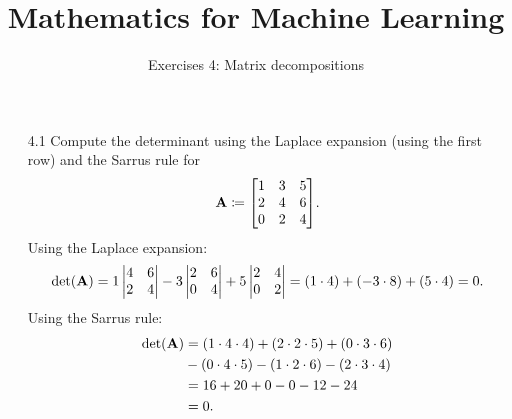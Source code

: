 \documentclass[11pt]{article}
\title{Mathematics for Machine Learning}
\subtitle{Exercises 4: Matrix decompositions}
\author{}
\date{}
\begin{document}
\maketitle

\begin{enumerate}

    \item[4.1] Compute the determinant using the Laplace expansion (using the first row) and the
          Sarrus rule for
          \[
              \mathbf{A} \coloneq
              \begin{bmatrix}
                  1 & 3 & 5 \\
                  2 & 4 & 6 \\
                  0 & 2 & 4 \\
              \end{bmatrix} \! .
          \]
          \vspace{1em}
          Using the Laplace expansion:
          \[
              \det(\mathbf{A})
              = 1
              \begin{vmatrix}
                  4 & 6 \\
                  2 & 4 \\
              \end{vmatrix}
              - 3
              \begin{vmatrix}
                  2 & 6 \\
                  0 & 4 \\
              \end{vmatrix}
              + 5
              \begin{vmatrix}
                  2 & 4 \\
                  0 & 2 \\
              \end{vmatrix}
              = (1 \cdot 4) + (-3 \cdot 8) + (5 \cdot 4)
              = 0.
          \]
          Using the Sarrus rule:
          \[
              \begin{aligned}
                  \det(\mathbf{A}) & = (1 \cdot 4 \cdot 4) + (2 \cdot 2 \cdot 5) + (0 \cdot 3 \cdot 6) \\
                                & - (0 \cdot 4 \cdot 5) - (1 \cdot 2 \cdot 6) - (2 \cdot 3 \cdot 4) \\
                                & = 16 + 20 + 0 - 0 - 12 - 24                                       \\
                                & = 0.
              \end{aligned}
          \]


\end{enumerate}
\end{document}
